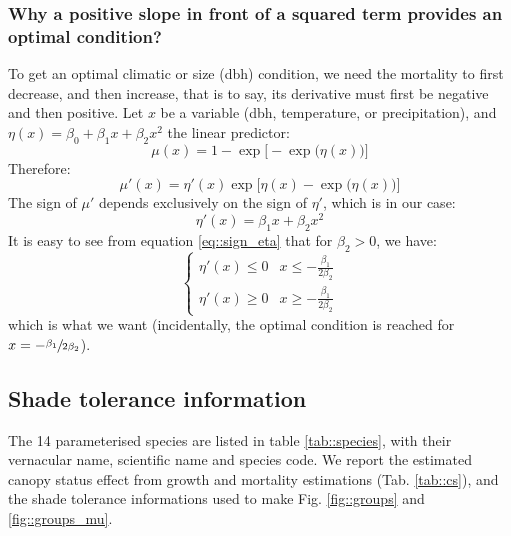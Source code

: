 \begin{refsection}
\subsubsection{Why a positive slope in front of a squared term provides an optimal condition?}
To get an optimal climatic or size (dbh) condition, we need the mortality to first decrease, and then increase, that is to say, its derivative must first be negative and then positive. Let $ x $ be a variable (dbh, temperature, or precipitation), and $ \eta(x) = \beta_0 + \beta_1 x + \beta_2 x^2 $ the linear predictor:
\[
	\mu(x) = 1 - \exp \Big[ -\exp \big(\eta(x) \big) \Big]
\]
Therefore:
\[
	\mu'(x) = \eta'(x) \exp \Big[ \eta(x) -\exp \big(\eta(x) \big) \Big]
\]
The sign of $ \mu' $ depends exclusively on the sign of $ \eta' $, which is in our case:
\begin{equation}\label{eq::sign_eta}
	\eta'(x) = \beta_1 x + \beta_2 x^2
\end{equation}
It is easy to see from equation \eqref{eq::sign_eta} that for $ \beta_2 > 0 $, we have:
\[
	\begin{cases}
		\eta'(x) \leqslant 0 & x \leqslant -\frac{\beta_1}{2\beta_2} \\
		\eta'(x) \geqslant 0 & x \geqslant -\frac{\beta_1}{2\beta_2}
	\end{cases}
\]
which is what we want (incidentally, the optimal condition is reached for $ x = -\sfrac{\beta_1}{2\beta_2}$).

\subsection{Shade tolerance information}
The 14 parameterised species are listed in table \ref{tab::species}, with their vernacular name, scientific name and species code. We report the estimated canopy status effect from growth and mortality estimations (Tab. \ref{tab::cs}), and the shade tolerance informations \citet{Burns1990, Burns1990a} used to make Fig. \ref{fig::groups} and \ref{fig::groups_mu}.


\end{refsection}
